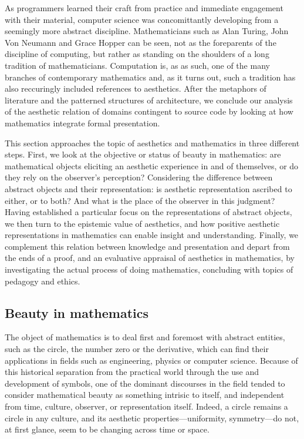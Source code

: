 
As programmers learned their craft from practice and immediate engagement with their material, computer science was concomittantly developing from a seemingly more abstract discipline. Mathematicians such as Alan Turing, John Von Neumann and Grace Hopper can be seen, not as the foreparents of the discipline of computing, but rather as standing on the shoulders of a long tradition of mathematicians. Computation is, as as such, one of the many branches of contemporary mathematics and, as it turns out, such a tradition has also reccuringly included references to aesthetics. After the metaphors of literature and the patterned structures of architecture, we conclude our analysis of the aesthetic relation of domains contingent to source code by looking at how mathematics integrate formal presentation.

This section approaches the topic of aesthetics and mathematics in three different steps. First, we look at the objective or status of beauty in mathematics: are mathematical objects eliciting an aesthetic experience in and of themselves, or do they rely on the observer's perception? Considering the difference between abstract objects and their representation: is aesthetic representation ascribed to either, or to both? And what is the place of the observer in this judgment? Having  established a particular focus on the representations of abstract objects, we then turn to the epistemic value of aesthetics, and how positive aesthetic representations in mathematics can enable insight and understanding. Finally, we complement this relation between knowledge and presentation and depart from the ends of a proof, and an evaluative appraisal of aesthetics in mathematics, by investigating the actual process of doing mathematics, concluding with topics of pedagogy and ethics.

\subsection{Beauty in mathematics}
\label{subsec:beauty-mathematics}

The object of mathematics is to deal first and foremost with abstract entities, such as the circle, the number zero or the derivative, which can find their applications in fields such as engineering, physics or computer science. Because of this historical separation from the practical world through the use and development of symbols, one of the dominant discourses in the field tended to consider mathematical beauty as something intrisic to itself, and independent from time, culture, observer, or representation itself. Indeed, a circle remains a circle in any culture, and its aesthetic properties—uniformity, symmetry—do not, at first glance, seem to be changing across time or space.

